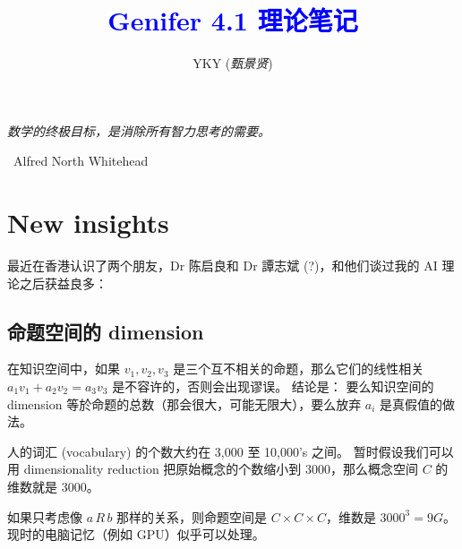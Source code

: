 \documentclass[12pt]{article}
\title{\textcolor{blue}{Genifer 4.1 理论笔记}}
\author{YKY (\textit{甄景贤})}
\newcommand{\tab}{\hspace*{1cm}}
\begin{document}
\tab\tab\tab \parbox{9cm}{\textit{数学的终极目标，是消除所有智力思考的需要。}}
\begin{flushright}
\textemdash\, Alfred North Whitehead \hspace{1cm}
\end{flushright}

\sffamily

{\let\newpage\relax\maketitle}

\maketitle
\setlength{\parindent}{0em}
\setlength{\parskip}{1.5ex plus0.5ex minus1.2ex}

\section{New insights}

最近在香港认识了两个朋友，Dr 陈启良和 Dr 譚志斌 (?)，和他们谈过我的 AI 理论之后获益良多：

\subsection{命题空间的 dimension}

在知识空间中，如果 $v_1, v_2, v_3$ 是三个互不相关的命题，那么它们的线性相关 $ a_1 v_1 + a_2 v_2 = a_3 v_3 $ 是不容许的，否则会出现谬误。 结论是： 要么知识空间的 dimension 等於命题的总数（那会很大，可能无限大），要么放弃 $a_i$ 是真假值的做法。

人的词汇 (vocabulary) 的个数大约在 3,000 至 10,000's 之间。  暂时假设我们可以用 dimensionality reduction 把原始概念的个数缩小到 3000，那么概念空间 $C$ 的维数就是 3000。

如果只考虑像 $a\, R\, b$ 那样的关系，则命题空间是 $C \times C \times C$，维数是 $3000^3 = 9G $。 现时的电脑记忆（例如 GPU）似乎可以处理。
\end{document}
